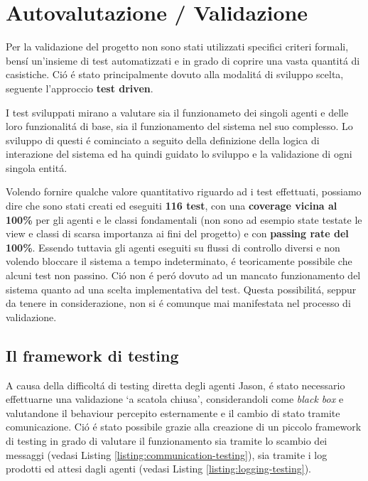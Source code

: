 \section{Autovalutazione / Validazione}



Per la validazione del progetto non sono stati utilizzati specifici criteri formali, bens\'i un’insieme di test automatizzati e in grado di coprire una vasta quantit\'a di casistiche. Ci\'o \'e stato principalmente dovuto alla modalit\'a di sviluppo scelta, seguente l'approccio \textbf{test driven}.

I test sviluppati mirano a valutare sia il funzionameto dei singoli agenti e delle loro funzionalit\'a di base, sia il funzionamento del sistema nel suo complesso. Lo sviluppo di questi \'e cominciato a seguito della definizione della logica di interazione del sistema ed ha quindi guidato lo sviluppo e la validazione di ogni singola entit\'a.

Volendo fornire qualche valore quantitativo riguardo ad i test effettuati, possiamo dire che sono stati creati ed eseguiti \textbf{116 test}, con una \textbf{coverage vicina al 100\%} per gli agenti e le classi fondamentali (non sono ad esempio state testate le view e classi di scarsa importanza ai fini del progetto) e con \textbf{passing rate del 100\%}. Essendo tuttavia gli agenti eseguiti su flussi di controllo diversi e non volendo bloccare il sistema a tempo indeterminato, \'e teoricamente possibile che alcuni test non passino. Ci\'o non \'e per\'o dovuto ad un mancato funzionamento del sistema quanto ad una scelta implementativa del test. Questa possibilit\'a, seppur da tenere in considerazione, non si \'e comunque mai manifestata nel processo di validazione.

\subsection{Il framework di testing}
A causa della difficolt\'a di testing diretta degli agenti Jason, \'e stato necessario effettuarne una validazione `a scatola chiusa', considerandoli come \textit{black box} e valutandone il behaviour percepito esternamente e il cambio di stato tramite comunicazione. Ci\'o \'e stato possibile grazie alla creazione di un piccolo framework di testing in grado di valutare il funzionamento sia tramite lo scambio dei messaggi (vedasi Listing \ref{listing:communication-testing}), sia tramite i log prodotti ed attesi dagli agenti (vedasi Listing \ref{listing:logging-testing}).

